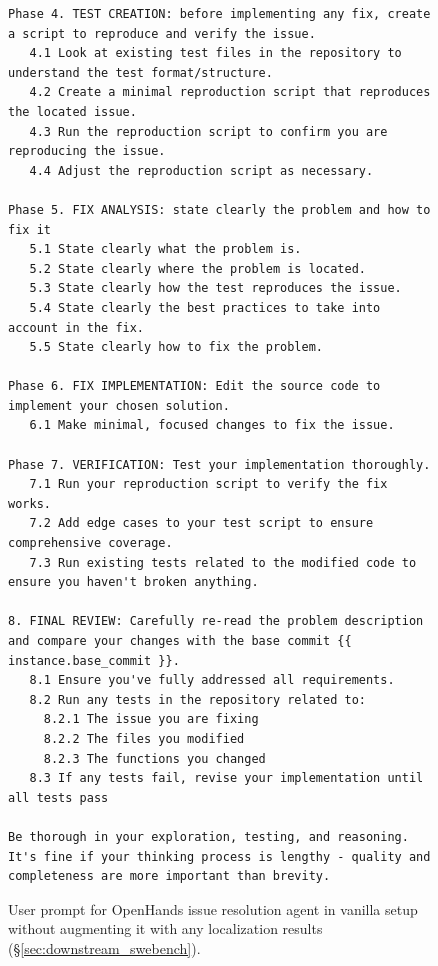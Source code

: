\begin{figure}[!h]
\begin{tcolorbox}[colback=purple!6!white, colframe=purple!75!black, title={\small User Prompt for OpenHands Issue Resolution Agent (Vanilla Setting)}]
\begin{lstlisting}[basicstyle=\fontsize{7.7}{8}\ttfamily]
Phase 4. TEST CREATION: before implementing any fix, create a script to reproduce and verify the issue.
   4.1 Look at existing test files in the repository to understand the test format/structure.
   4.2 Create a minimal reproduction script that reproduces the located issue.
   4.3 Run the reproduction script to confirm you are reproducing the issue.
   4.4 Adjust the reproduction script as necessary.

Phase 5. FIX ANALYSIS: state clearly the problem and how to fix it
   5.1 State clearly what the problem is.
   5.2 State clearly where the problem is located.
   5.3 State clearly how the test reproduces the issue.
   5.4 State clearly the best practices to take into account in the fix.
   5.5 State clearly how to fix the problem.

Phase 6. FIX IMPLEMENTATION: Edit the source code to implement your chosen solution.
   6.1 Make minimal, focused changes to fix the issue.

Phase 7. VERIFICATION: Test your implementation thoroughly.
   7.1 Run your reproduction script to verify the fix works.
   7.2 Add edge cases to your test script to ensure comprehensive coverage.
   7.3 Run existing tests related to the modified code to ensure you haven't broken anything.

8. FINAL REVIEW: Carefully re-read the problem description and compare your changes with the base commit {{ instance.base_commit }}.
   8.1 Ensure you've fully addressed all requirements.
   8.2 Run any tests in the repository related to:
     8.2.1 The issue you are fixing
     8.2.2 The files you modified
     8.2.3 The functions you changed
   8.3 If any tests fail, revise your implementation until all tests pass

Be thorough in your exploration, testing, and reasoning. It's fine if your thinking process is lengthy - quality and completeness are more important than brevity.

\end{lstlisting}
\end{tcolorbox}
\caption{User prompt for OpenHands issue resolution agent in vanilla setup without augmenting it with any localization results (\S\ref{sec:downstream_swebench}).}
\label{fig:user_prompt_vanilla}
\end{figure}

